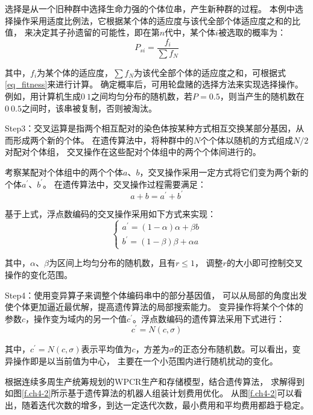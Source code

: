 选择是从一个旧种群中选择生命力强的个体位串，产生新种群的过程。
本例中选择操作采用适度比例法，它根据某个体的适应度与该代全部个体适应度之和的比值，
来决定其子孙遗留的可能性，即在第$n$代中，某个体$i$被选取的概率为：
\begin{equation}
    P_{si}=\frac{f_i}{\sum f_N}
\end{equation}

其中，$f_i$为某个体的适应度，$\sum f_N$为该代全部个体的适应度之和，可根据式\ref{eq_fitness}来进行计算。
确定概率后，可用轮盘赌的选择方法来实现选择操作。
例如，用计算机生成$0~1$之间均匀分布的随机数，若$P=0.5$，则当产生的随机数在$0~0.5$之间时，该串被复制，否则被淘汰。

Step3：交叉运算是指两个相互配对的染色体按某种方式相互交换某部分基因，从而形成两个新的个体。
在遗传算法中，将种群中的$N$个个体以随机的方式组成$N/2$对配对个体组，
交叉操作在这些配对个体组中的两个个体间进行的。

考察某配对个体组中的两个个体$a$、$b$，交叉操作采用一定方式将它们变为两个新的个体$a^{'}$、$b^{'}$。
在遗传算法中，交叉操作过程需要满足：
\begin{equation}
    a+b=a^{'}+b^{'}
\end{equation}

基于上式，浮点数编码的交叉操作采用如下方式来实现：
\begin{equation}
    \begin{cases}
        a^{'}=(1-\alpha)\alpha+\beta b \\
        b^{'}=(1-\beta)\beta+\alpha a
    \end{cases}
\end{equation}

其中，$\alpha$、$\beta$为区间上均匀分布的随机数，且有$r\leq1$，
调整$r$的大小即可控制交叉操作的变化范围。

Step4：使用变异算子来调整个体编码串中的部分基因值，
可以从局部的角度出发使个体更加逼近最优解，提高遗传算法的局部搜索能力。
变异操作将某个个体的参数$c$，操作变为域内的另一个值$c^{'}$。浮点数编码的遗传算法采用下式进行：
\begin{equation}
    c^{'}=N(c,\sigma)
\end{equation}

其中，$c^{'}=N(c,\sigma)$表示平均值为$c$，方差为$\sigma$的正态分布随机数。可以看出，变异操作即是以当前值为中心，
主要在一个小范围内进行随机扰动的变化\cite{余胜威2015matlab}。

根据连续多周生产统筹规划的WPCR生产和存储模型，结合遗传算法，
求解得到如图\ref{f.ch4-2}所示基于遗传算法的机器人组装计划费用优化。
从图\ref{f.ch4-2}可以看出，随着迭代次数的增多，到达一定迭代次数，最小费用和平均费用都趋于稳定。

